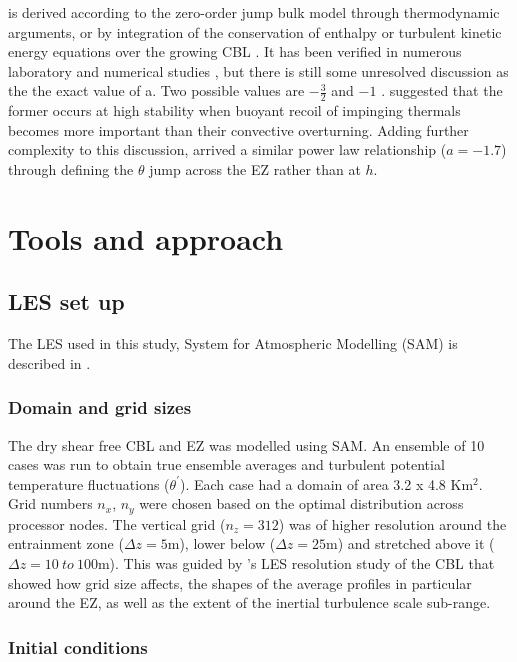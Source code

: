 is derived according to the zero-order jump bulk model through thermodynamic arguments, or by integration of the conservation of enthalpy or turbulent kinetic energy equations over the growing CBL \citep{Tennekes73, Deardorff79, FedConzMir04}. It has been verified in numerous laboratory and numerical studies \citep{DearWill80, SullMoengStev, FedConzMir04, BrooksFowler2}, but there is still some unresolved discussion as the the exact value of a.  Two possible values are $-\frac{3}{2}$ and $-1$ \citep{Traum11}.  \cite{Turner86} suggested that the former occurs at high stability when buoyant recoil of impinging thermals becomes more important than their convective overturning.  Adding further complexity to this discussion, \cite{FedConzMir04} arrived a similar power law relationship ($a = -1.7$) through defining the $\theta$ jump across the EZ rather than at $h$.\\

\section{Tools and approach}

\subsection{LES set up}

The LES used in this study, System for Atmospheric Modelling (SAM) is described in \cite{KhairRand}.

\subsubsection{Domain and grid sizes}
The dry shear free CBL and EZ was modelled using SAM.  An ensemble of 10 cases was run to obtain true ensemble averages and turbulent potential temperature fluctuations ($\theta^{'}$). Each case had a domain of area 3.2 x 4.8 Km$^{2}$.  Grid numbers $n_{x}$, $n_{y}$ were chosen based on the optimal distribution across processor nodes. The vertical grid ($n_{z}=312$) was of higher resolution around the entrainment zone ($\Delta z = 5$m), lower below ($\Delta z = 25$m) and stretched above it ($\Delta z = 10 \ to \ 100 $m). This was guided by \cite{SullPat}'s LES resolution study of the CBL that showed how grid size affects, the shapes of the average profiles in particular around the EZ, as well as the extent of the inertial turbulence scale sub-range.\\

\subsubsection{Initial conditions}

